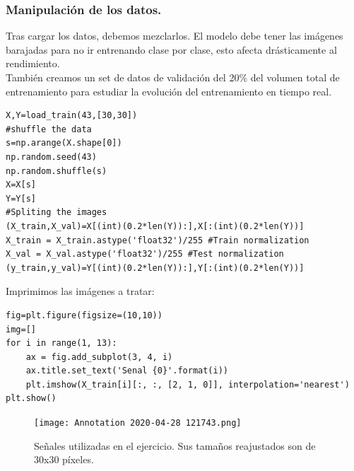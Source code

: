 \documentclass[a4paper,11pt]{article}
\begin{document}
\subsubsection{Manipulación de los datos.}
Tras cargar los datos, debemos mezclarlos. El modelo debe tener las imágenes barajadas para no ir entrenando clase por clase, esto afecta drásticamente al rendimiento. \\

\noindent
También creamos un set de datos de validación del 20\% del volumen total de entrenamiento para estudiar la evolución del entrenamiento en tiempo real.
\begin{lstlisting}
X,Y=load_train(43,[30,30])
#shuffle the data
s=np.arange(X.shape[0])
np.random.seed(43)
np.random.shuffle(s)
X=X[s]
Y=Y[s]
#Spliting the images 
(X_train,X_val)=X[(int)(0.2*len(Y)):],X[:(int)(0.2*len(Y))]
X_train = X_train.astype('float32')/255 #Train normalization 
X_val = X_val.astype('float32')/255 #Test normalization
(y_train,y_val)=Y[(int)(0.2*len(Y)):],Y[:(int)(0.2*len(Y))]
\end{lstlisting}
Imprimimos las imágenes a tratar:
\begin{lstlisting}
fig=plt.figure(figsize=(10,10))
img=[]
for i in range(1, 13):
    ax = fig.add_subplot(3, 4, i)
    ax.title.set_text('Senal {0}'.format(i))
    plt.imshow(X_train[i][:, :, [2, 1, 0]], interpolation='nearest')
plt.show()
\end{lstlisting}
\begin{figure}[H]
\centering
\texttt{[image: Annotation 2020-04-28 121743.png]}
\caption{Señales utilizadas en el ejercicio. Sus tamaños reajustados son de 30x30 píxeles.}
\end{figure}
\end{document}
